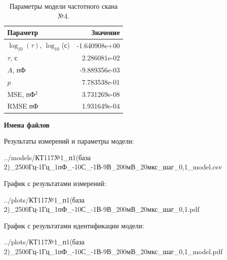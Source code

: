 \begin{table}[!ht]
    \centering
    \caption{Параметры модели частотного скана №4.}
    \begin{tabular}{|l|r|}
        \hline
        Параметр                                       & Значение                  \\ \hline
        $\log_{10}(\tau)$, $\log_{10}$(с)              & -1.640908e+00             \\ \hline
        $\tau$, с                                      & 2.286081e-02              \\ \hline
        $A$, пФ                                        & -9.889356e-03             \\ \hline
        $p$                                            & 7.783538e-01              \\ \hline
        MSE, пФ$^2$                                    & 3.731269e-08              \\ \hline
        RMSE пФ                                        & 1.931649e-04              \\ \hline
    \end{tabular}
    \label{table:frequency_scan_model_4}
\end{table}

\textbf{Имена файлов}

Результаты измерений и параметры модели:

\scriptsize../models/КТ117№1\_п1(база 2)\_2500Гц-1Гц\_1пФ\_-10С\_-1В-9В\_200мВ\_20мкс\_шаг\_0,1\_model.csv
\normalsize

График с результатами измерений:

\scriptsize../plots/КТ117№1\_п1(база 2)\_2500Гц-1Гц\_1пФ\_-10С\_-1В-9В\_200мВ\_20мкс\_шаг\_0,1.pdf
\normalsize

График с результатами идентификации модели:

\scriptsize../plots/КТ117№1\_п1(база 2)\_2500Гц-1Гц\_1пФ\_-10С\_-1В-9В\_200мВ\_20мкс\_шаг\_0,1\_model.pdf
\normalsize

